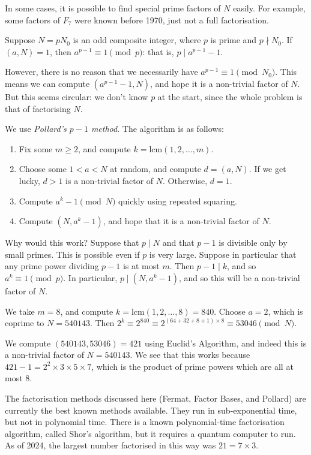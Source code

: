 \documentclass{article}
\begin{document}
In some cases, it is possible to find special prime factors of $N$ easily. For example, some factors of $F_7$ were known before 1970, just not a full factorisation.

\begin{remark}
    Suppose $N = p N_0$ is an odd composite integer, where $p$ is prime and $p \nmid N_0$. If $(a, N) = 1$, then $a^{p-1} \equiv 1 \pmod p$: that is, $p \mid a^{p-1} - 1$.
    
    However, there is no reason that we necessarily have $a^{p-1} \equiv 1 \pmod{N_0}$. This means we can compute $(a^{p-1} - 1, N)$, and hope it is a non-trivial factor of $N$. But this seems circular: we don't know $p$ at the start, since the whole problem is that of factorising $N$.
    
    We use \textit{Pollard's $p-1$ method}. The algorithm is as follows:
    \begin{enumerate}
	    \item Fix some $m \geq 2$, and compute $k = \mathrm{lcm}(1, 2, \dots, m)$.
	    \item Choose some $1 < a < N$ at random, and compute $d = (a, N)$. If we get lucky, $d > 1$ is a non-trivial factor of $N$. Otherwise, $d = 1$.
	    \item Compute $a^k - 1 \pmod N$ quickly using repeated squaring.
	    \item Compute $(N, a^k  -1)$, and hope that it is a non-trivial factor of $N$.
	\end{enumerate}
	Why would this work? Suppose that $p \mid N$ and that $p - 1$ is divisible only by small primes. This is possible even if $p$ is very large. Suppose in particular that any prime power dividing $p-1$ is at most $m$. Then $p-1 \mid k$, and so $a^k \equiv 1 \pmod p$. In particular, $p \mid (N, a^k - 1)$, and so this will be a non-trivial factor of $N$.
\end{remark}

\begin{example}[Factorising 540143]
    We take $m = 8$, and compute $k = \mathrm{lcm}(1, 2, \dots, 8) = 840$. Choose $a = 2$, which is coprime to $N = 540143$. Then $2^k \equiv 2^{840} \equiv 2^{(64+32 + 8 + 1) \times 8} \equiv 53046 \pmod N$.
    
    We compute $(540143, 53046) = 421$ using Euclid's Algorithm, and indeed this is a non-trivial factor of $N = 540143$. We see that this works because $421-1 = 2^2 \times 3 \times 5 \times 7$, which is the product of prime powers which are all at most 8.
\end{example}

\begin{note}
	The factorisation methods discussed here (Fermat, Factor Bases, and Pollard) are currently the best known methods available. They run in sub-exponential time, but not in polynomial time. There is a known polynomial-time factorisation algorithm, called Shor's algorithm, but it requires a quantum computer to run. As of 2024, the largest number factorised in this way was $21 = 7 \times 3$.
\end{note}
\end{document}
